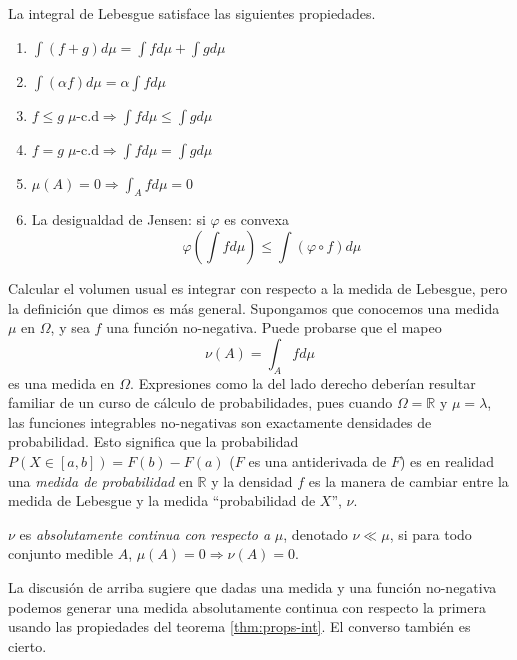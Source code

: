 \documentclass[main.tex]{subfiles}
\begin{document}
\begin{theorem}\label{thm:props-int}
La integral de Lebesgue satisface las siguientes propiedades.
\begin{enumerate}[label=\roman*.]
	\item $\int (f+g)d\mu = \int f d\mu + \int g d\mu$
	\item $\int(\alpha f)d\mu = \alpha \int f d\mu$
	\item $f \leq g \; \mu\text{-c.d} \Rightarrow \int fd\mu \leq \int gd\mu$
	\item $f = g\; \mu\text{-c.d} \Rightarrow \int fd\mu = \int gd\mu$
	\item $\mu(A)=0\Rightarrow \int_Afd\mu=0$
	\item La desigualdad de Jensen: si $\varphi$ es convexa
		\begin{equation*}
			\varphi\left(\int fd\mu \right) \leq \int\left(\varphi\circ f\right)d\mu
		\end{equation*}
\end{enumerate}	
\end{theorem}

Calcular el volumen usual es integrar con respecto a la medida de Lebesgue, pero la definición que dimos es más general. Supongamos que conocemos una medida $\mu$ en $\Omega$, y sea $f$ una función no-negativa. Puede probarse que el mapeo
\begin{equation*}
	\nu(A)=\int_Afd\mu 
\end{equation*} 
es una medida en $\Omega$. Expresiones como la del lado derecho deberían resultar familiar de un curso de cálculo de probabilidades, pues cuando $\Omega=\mathbb{R}$ y $\mu=\lambda$, las funciones integrables no-negativas son exactamente densidades de probabilidad. Esto significa que la probabilidad $P(X\in [a,b])=F(b)-F(a)$ ($F$ es una antiderivada de $F$) es en realidad una \textit{medida de probabilidad} en $\mathbb{R}$ y la densidad $f$ es la manera de cambiar entre la medida de Lebesgue y la medida \enquote{probabilidad de $X$}, $\nu$. 

\begin{definition}
$\nu$ es \textit{absolutamente continua con respecto a} $\mu$, denotado $\nu \ll \mu$, si para todo conjunto medible $A$, $\mu(A)=0 \Rightarrow \nu(A)=0$. 
\end{definition}

La discusión de arriba sugiere que dadas una medida y una función no-negativa podemos generar una medida absolutamente continua con respecto la primera usando las propiedades del teorema \ref{thm:props-int}. El converso también es cierto.
\end{document}
